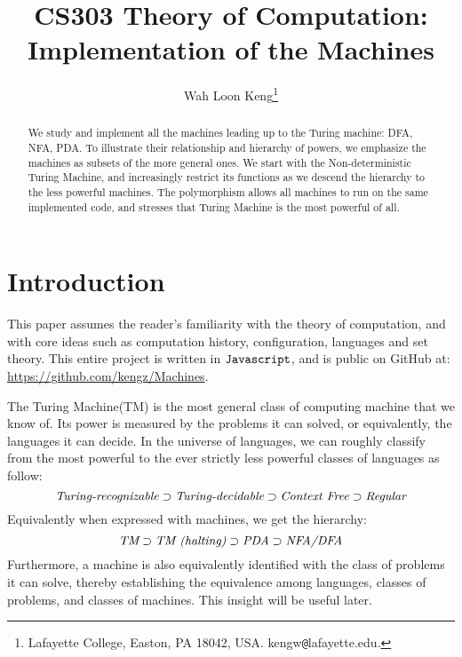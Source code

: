 \documentclass[12pt]{article}  %
\begin{document}
\title{CS303 Theory of Computation:\\ Implementation of the Machines}

\author{
{Wah Loon Keng}\thanks{
Lafayette College,
Easton, PA 18042, USA.
kengw{\tt @}lafayette.edu.}
}
\maketitle

\begin{abstract}
We study and implement all the machines leading up to the Turing machine: DFA, NFA, PDA. To illustrate their relationship and hierarchy of powers, we emphasize the machines as subsets of the more general ones. We start with the Non-deterministic Turing Machine, and increasingly restrict its functions as we descend the hierarchy to the less powerful machines. The polymorphism allows all machines to run on the same implemented code, and stresses that Turing Machine is the most powerful of all.
\end{abstract}







\section{Introduction} \label{intro}


This paper assumes the reader's familiarity with the theory of computation, and with core ideas such as computation history, configuration, languages and set theory. This entire project is written in ${\tt Javascript}$, and is public on GitHub at: \url{https://github.com/kengz/Machines}.

The Turing Machine(TM) is the most general class of computing machine that we know of. Its power is measured by the problems it can solved, or equivalently, the languages it can decide. In the universe of languages, we can roughly classify from the most powerful to the ever strictly less powerful classes of languages as follow:
$$\emph{Turing-recognizable} \supset \emph{Turing-decidable} \supset \emph{Context Free} \supset \emph{Regular}$$
Equivalently when expressed with machines, we get the hierarchy:
$$\emph{TM} \supset \emph{TM (halting)} \supset \emph{PDA} \supset \emph{NFA/DFA}$$
Furthermore, a machine is also equivalently identified with the class of problems it can solve, thereby establishing the equivalence among languages, classes of problems, and classes of machines. This insight will be useful later.
\end{document}
